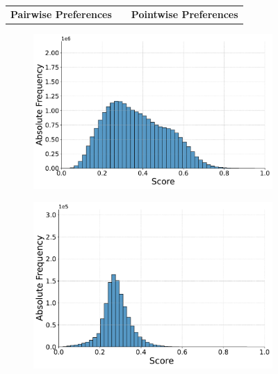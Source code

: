 \begin{figure}[ht!]
    \centering
    \begin{tabular}{ccc}
        \textbf{Pairwise Preferences} & \hspace{2cm} & \textbf{Pointwise Preferences} \\
    \end{tabular}
    \footnotesize
    \begin{subfigure}[b]{0.49\textwidth}
        \centering
        \includegraphics[width=\textwidth]{graphics/seaborn/pairwise_self_score_distribution_flan-t5-base.pdf}
        \label{fig:pairwise_flan-t5-base}
    \end{subfigure}
    \hfill
    \begin{subfigure}[b]{0.49\textwidth}
        \centering
        \includegraphics[width=\textwidth]{graphics/seaborn/pointwise_self_score_distribution_flan-t5-base.pdf}
        \label{fig:pointwise_flan-t5-base}
    \end{subfigure}


\end{figure}
